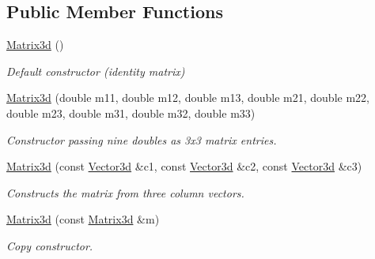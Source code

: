 \subsection*{Public Member Functions}
\begin{DoxyCompactItemize}
\item 
\mbox{\label{classCPlantBox_1_1Matrix3d_aba20b85af0ce770d0ac0aba44b7ebb94}} 
\hyperlink{classCPlantBox_1_1Matrix3d_aba20b85af0ce770d0ac0aba44b7ebb94}{Matrix3d} ()
\begin{DoxyCompactList}\small\item\em Default constructor (identity matrix) \end{DoxyCompactList}\item 
\mbox{\label{classCPlantBox_1_1Matrix3d_a1a0f7c0db69375fbaf99f7354366d5da}} 
\hyperlink{classCPlantBox_1_1Matrix3d_a1a0f7c0db69375fbaf99f7354366d5da}{Matrix3d} (double m11, double m12, double m13, double m21, double m22, double m23, double m31, double m32, double m33)
\begin{DoxyCompactList}\small\item\em Constructor passing nine doubles as 3x3 matrix entries. \end{DoxyCompactList}\item 
\mbox{\label{classCPlantBox_1_1Matrix3d_a660dff2581b4f427acfff025f7655fc7}} 
\hyperlink{classCPlantBox_1_1Matrix3d_a660dff2581b4f427acfff025f7655fc7}{Matrix3d} (const \hyperlink{classCPlantBox_1_1Vector3d}{Vector3d} \&c1, const \hyperlink{classCPlantBox_1_1Vector3d}{Vector3d} \&c2, const \hyperlink{classCPlantBox_1_1Vector3d}{Vector3d} \&c3)
\begin{DoxyCompactList}\small\item\em Constructs the matrix from three column vectors. \end{DoxyCompactList}\item 
\mbox{\label{classCPlantBox_1_1Matrix3d_af7de6b14f07dc9d6968a53d3ef14c360}} 
\hyperlink{classCPlantBox_1_1Matrix3d_af7de6b14f07dc9d6968a53d3ef14c360}{Matrix3d} (const \hyperlink{classCPlantBox_1_1Matrix3d}{Matrix3d} \&m)
\begin{DoxyCompactList}\small\item\em Copy constructor. \end{DoxyCompactList}\item 

\end{DoxyCompactItemize}
